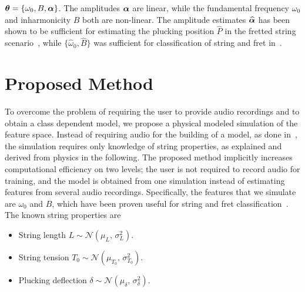 \documentclass{article}
\begin{document}
\begin{sloppy}
  $\text{\boldmath$\theta$} = \{\omega_0, B, \text{\boldmath$\alpha$}\}$.
The amplitudes $\text{\boldmath$\alpha$}$ are linear, while the fundamental frequency $\omega_0$ and inharmonicity $B$ both are non-linear. 
The amplitude estimates $\text{\boldmath${\widehat\alpha}$}$ has been shown to be sufficient for estimating the plucking position $\widehat{P}$ in the fretted string scenario~\cite{hjerrild::icassp19}, while $\{\widehat\omega_0, \widehat B \} $ was sufficient for classification of string and fret in~\cite{barbancho:inharmonicity_tablature,michelson2018_aes}.%
%
%
%
\section{Proposed Method}\label{sec:proposed_method}
To overcome the problem of requiring the user to provide audio recordings and to obtain a class dependent model, we propose a physical modeled simulation of the feature space. Instead of requiring audio for the building of a model, as done in~\cite{abesser:automatic_string_detection_ml,barbancho:inharmonicity_tablature,michelson2018_aes,hjerrild::icassp19}, the simulation requires only knowledge of string properties, as explained and derived from physics in the following. The proposed method implicitly increases computational efficiency on two levels; the user is not required to record audio for training, and the model is obtained from one simulation instead of estimating features from several audio recordings. Specifically, the features that we simulate are ${\omega}_0$ and $B$, which have been proven useful for string and fret classification~\cite{barbancho:inharmonicity_tablature, michelson2018_aes,hjerrild::icassp19}. The known string properties are
\begin{itemize}
    \item String length $L \sim \mathcal{N}(\mu_{L}, \,\sigma_{L}^{2} ) $.
    \item String tension $T_0 \sim \mathcal{N}(\mu_{T_0},\,\sigma_{T_0}^{2})$.
    \item Plucking deflection $\delta \sim \mathcal{N}(\mu_{\delta},\,\sigma_{\delta}^{2})$.


\end{itemize}
\end{sloppy}
\end{document}
